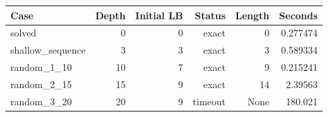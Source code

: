 {\small
\begin{tabular}{lrrrrr}
\hline
Case & Depth & Initial LB & Status & Length & Seconds \\
\hline
solved & 0 & 0 & exact & 0 & 0.277474 \\
shallow\_sequence & 3 & 3 & exact & 3 & 0.589334 \\
random\_1\_10 & 10 & 7 & exact & 9 & 0.215241 \\
random\_2\_15 & 15 & 9 & exact & 14 & 2.39563 \\
random\_3\_20 & 20 & 9 & timeout & None & 180.021 \\
\hline
\end{tabular}
}
